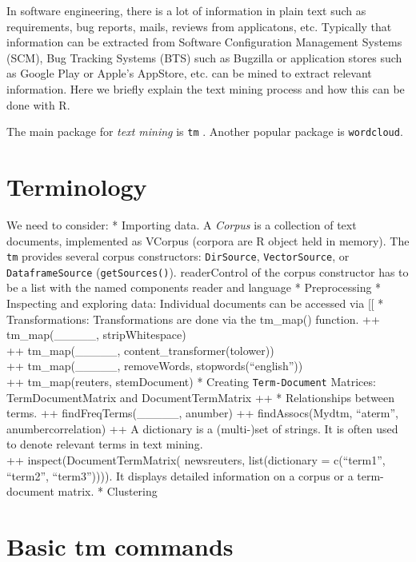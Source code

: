 \documentclass[]{book}
\begin{document}
In software engineering, there is a lot of information in plain text
such as requirements, bug reports, mails, reviews from applicatons, etc.
Typically that information can be extracted from Software Configuration
Management Systems (SCM), Bug Tracking Systems (BTS) such as Bugzilla or
application stores such as Google Play or Apple's AppStore, etc. can be
mined to extract relevant information. Here we briefly explain the text
mining process and how this can be done with R.

The main package for \emph{text mining} is \texttt{tm}
\citep[\citet{FeinererHM08}]{FeinererH15}. Another popular package is
\texttt{wordcloud}.

\section{Terminology}\label{terminology}

We need to consider: * Importing data. A \emph{Corpus} is a collection
of text documents, implemented as VCorpus (corpora are R object held in
memory). The \texttt{tm} provides several corpus constructors:
\texttt{DirSource}, \texttt{VectorSource}, or \texttt{DataframeSource}
(\texttt{getSources()}). readerControl of the corpus constructor has to
be a list with the named components reader and language * Preprocessing
* Inspecting and exploring data: Individual documents can be accessed
via {[}{[} * Transformations: Transformations are done via the tm\_map()
function. ++ tm\_map(\_\_\_\_\_, stripWhitespace)\\
++ tm\_map(\_\_\_\_\_, content\_transformer(tolower))\\
++ tm\_map(\_\_\_\_\_, removeWords, stopwords(``english''))\\
++ tm\_map(reuters, stemDocument) * Creating \texttt{Term-Document}
Matrices: TermDocumentMatrix and DocumentTermMatrix ++ * Relationships
between terms. ++ findFreqTerms(\_\_\_\_\_, anumber) ++
findAssocs(Mydtm, ``aterm'', anumbercorrelation) ++ A dictionary is a
(multi-)set of strings. It is often used to denote relevant terms in
text mining.\\
++ inspect(DocumentTermMatrix( newsreuters, list(dictionary =
c(``term1'', ``term2'', ``term3'')))). It displays detailed information
on a corpus or a term-document matrix. * Clustering

\section{\texorpdfstring{Basic \textbf{tm}
commands}{Basic tm commands}}\label{basic-tm-commands}
\end{document}
